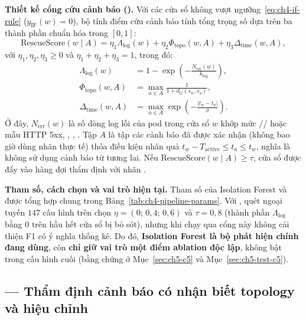 \textbf{Thiết kế cổng cứu cảnh báo  ().} Với các cửa sổ không vượt ngưỡng~\eqref{eq:ch4-if-rule} ($y_{\text{IF}}(w) = 0$), bộ tính điểm cứu cảnh báo tính tổng trọng số dựa trên ba thành phần chuẩn hóa trong $[0, 1]$:
\begin{equation}
  \text{RescueScore}(w \mid A) = \eta_1 \Lambda_{\text{log}}(w) + \eta_2 \Phi_{\text{topo}}(w, A) + \eta_3 \Delta_{\text{time}}(w, A),
  \label{eq:ch4-rescue}
\end{equation}
với $\eta_1, \eta_2, \eta_3 \ge 0$ và $\eta_1 + \eta_2 + \eta_3 = 1$, trong đó:
\begin{align}
  \Lambda_{\text{log}}(w) &= 1 - \exp\!\left(-\frac{N_{\text{err}}(w)}{k_{\text{log}}}\right), \label{eq:ch4-rescue-log} \\
  \Phi_{\text{topo}}(w, A) &= \max_{a \in A} \frac{1}{1 + d_G(s_w, s_a)}, \label{eq:ch4-rescue-topo} \\
  \Delta_{\text{time}}(w, A) &= \max_{a \in A} \exp\!\left(-\frac{|t_w - t_a|}{\sigma}\right). \label{eq:ch4-rescue-time}
\end{align}
Ở đây, $N_{\text{err}}(w)$ là số dòng log lỗi của pod trong cửa sổ $w$ khớp mức // hoặc mẫu HTTP 5xx, , , . Tập $A$ là tập các cảnh báo đã được \CTAV{} xác nhận (không bao giờ dùng nhãn thực tế) thỏa điều kiện nhân quả $t_w - T_{\text{active}} \le t_a \le t_w$, nghĩa là không sử dụng cảnh báo từ tương lai. Nếu $\text{RescueScore}(w \mid A) \ge \tau$, cửa sổ được đẩy vào hàng đợi thẩm định với nhãn .

\textbf{Tham số, cách chọn và vai trò hiện tại.} Tham số của Isolation Forest và  được tổng hợp chung trong Bảng~\ref{tab:ch4-pipeline-params}. Với , quét ngoại tuyến $147$ cấu hình trên  chọn $\eta = (0;\, 0{,}4;\, 0{,}6)$ và $\tau = 0{,}8$ (thành phần $\Lambda_{\text{log}}$ bằng $0$ trên hầu hết cửa sổ bị bỏ sót), nhưng khi chạy qua \CTAV{} cổng này không cải thiện F1 có ý nghĩa thống kê. Do đó, \textbf{Isolation Forest là bộ phát hiện chính đang dùng}, còn \textbf{ chỉ giữ vai trò một điểm ablation độc lập}, không bật trong cấu hình cuối (bằng chứng ở Mục~\ref{sec:ch5-c5} và Mục~\ref{sec:ch5-test-c5}).

\subsection{\CTAV{} — Thẩm định cảnh báo có nhận biết topology và hiệu chỉnh}
\label{sec:ch4-ctav}

